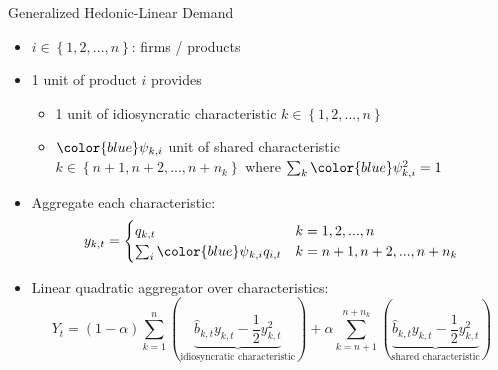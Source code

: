 \documentclass[english,aspectratio=169,handout]{beamer}
\theoremstyle{plain}
\begin{document}
\begin{frame}{Generalized Hedonic-Linear Demand \citep{Pellegrino2024-dn}}
    \begin{itemize}
      \item \label{ghl}$i\in\left\{ 1,2,...,n\right\} $: firms / products
      \item 1 unit of product $i$ provides
            \begin{itemize}
              \item 1 unit of idiosyncratic characteristic $k\in\left\{ 1,2,...,n\right\} $
              \item ${\color{blue}\psi{}_{k,i}}$ unit of shared characteristic $k\in\left\{ n+1,n+2,...,n+n_{k}\right\} $
                    where $\sum_{k}{\color{blue}\psi_{k,i}^{2}}=1$
            \end{itemize}
      \item Aggregate each characteristic:
            \[
              y_{k,t}=\begin{cases}
                q_{k,t}                                   & k=1,2,...,n           \\
                \sum_{i}{\color{blue}\psi{}_{k,i}}q_{i,t} & k=n+1,n+2,...,n+n_{k}
              \end{cases}
            \]
      \item Linear quadratic aggregator over characteristics:
            \[
              Y_{t}=\left(1-\alpha\right)\sum_{k=1}^{n}\left(\underbrace{\hat{b}_{k,t}y_{k,t}-\frac{1}{2}y_{k,t}^{2}}_{\text{idiosyncratic characteristic}}\right)+\alpha\sum_{k=n+1}^{n+n_{k}}\left(\underbrace{\hat{b}_{k,t}y_{k,t}-\frac{1}{2}y_{k,t}^{2}}_{\text{shared characteristic}}\right)
            \]
    \end{itemize}
\end{frame}
\end{document}
